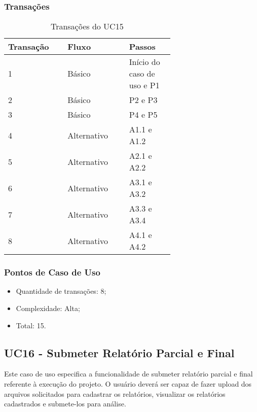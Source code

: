   \subsubsection{Transações}

  \begin{table*}[!h]
  \centering
  \caption{Transações do UC15}
  \label{uc15_transactions}
    \begin{tabular}{|p{0.20\linewidth}|p{0.25\linewidth}|p{0.20\linewidth}|}
    \hline
    \textbf{Transação} & \textbf{Fluxo} & \textbf{Passos} \\ 
    \hline
    1 & Básico & Início do caso de uso e P1\\
    \hline
    2 & Básico & P2 e P3\\
    \hline
    3 & Básico & P4 e P5\\
    \hline
    4 & Alternativo & A1.1 e A1.2\\
    \hline
    5 & Alternativo & A2.1 e A2.2\\
    \hline
    6 & Alternativo & A3.1 e A3.2\\
    \hline
    7 & Alternativo & A3.3 e A3.4\\
    \hline
    8 & Alternativo & A4.1 e A4.2\\
    \hline
    \end{tabular}
  \end{table*}

  \subsubsection{Pontos de Caso de Uso}

  \begin{itemize}
  \item Quantidade de transações: 8;
  \item Complexidade: Alta;
  \item Total: 15.
  \end{itemize}


\subsection{UC16 - Submeter Relatório Parcial e Final}
  
  Este caso de uso especifica a funcionalidade de submeter relatório parcial e final referente à execução do projeto.
  O usuário deverá ser capaz de fazer upload dos arquivos solicitados para cadastrar os relatórios, visualizar os
  relatórios cadastrados e submete-los para análise.
  
